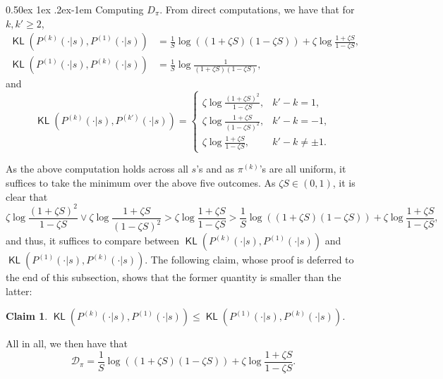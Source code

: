 \documentclass[twoside]{article}
\makeatletter
\renewcommand{\paragraph}{%
  \@startsection{paragraph}{4}%
  {\z@}{0.50ex \@plus 1ex \@minus .2ex}{-1em}%
  {\normalfont\normalsize\bfseries}%
}
\DeclareMathOperator{\KL}{{\mathsf{KL}}}
\def\gD{{\mathcal{D}}}
\theoremstyle{plain}
\newtheorem{claim}{Claim}[section]
\makeatother
\begin{document}
\paragraph{Computing $D_\pi$.}
From direct computations, we have that for $k, k' \geq 2$,
\begin{align*}
    \KL\left( P^{(k)}(\cdot | s), P^{(1)}(\cdot | s) \right) &= \frac{1}{S} \log\left( (1 + \zeta S) (1 - \zeta S) \right) + \zeta \log\frac{1 + \zeta S}{1 - \zeta S}, \\
    \KL\left( P^{(1)}(\cdot | s), P^{(k)}(\cdot | s) \right) &= \frac{1}{S} \log\frac{1}{(1 + \zeta S)(1 - \zeta S)},
\end{align*}
and
\begin{equation*}
    \KL\left( P^{(k)}(\cdot | s), P^{(k')}(\cdot | s) \right) =
    \begin{cases}
        \zeta \log \frac{(1 + \zeta S)^2}{1 - \zeta S}, & k' - k = 1,\\
        \zeta \log\frac{1 + \zeta S}{(1 - \zeta S)^2}, & k' - k = - 1,\\
        \zeta \log\frac{1 + \zeta S}{1 - \zeta S}, & k' - k \neq \pm 1.
    \end{cases}
\end{equation*}

As the above computation holds across all $s$'s and as $\pi^{(k)}$'s are all uniform, it suffices to take the minimum over the above five outcomes.
As $\zeta S \in (0, 1)$, it is clear that
\begin{equation*}
    \zeta \log \frac{(1 + \zeta S)^2}{1 - \zeta S} \vee \zeta \log\frac{1 + \zeta S}{(1 - \zeta S)^2} > \zeta \log\frac{1 + \zeta S}{1 - \zeta S}
    > \frac{1}{S} \log\left( (1 + \zeta S) (1 - \zeta S) \right) + \zeta \log\frac{1 + \zeta S}{1 - \zeta S},
\end{equation*}
and thus, it suffices to compare between $\KL\left( P^{(k)}(\cdot | s), P^{(1)}(\cdot | s) \right)$ and $\KL\left( P^{(1)}(\cdot | s), P^{(k)}(\cdot | s) \right)$.
The following claim, whose proof is deferred to the end of this subsection, shows that the former quantity is smaller than the latter:
\begin{claim}
\label{claim:compare-kl}
    $\KL\left( P^{(k)}(\cdot | s), P^{(1)}(\cdot | s) \right) \leq \KL\left( P^{(1)}(\cdot | s), P^{(k)}(\cdot | s) \right)$.
\end{claim}

All in all, we then have that
\begin{equation*}
    \gD_\pi = \frac{1}{S} \log\left( (1 + \zeta S) (1 - \zeta S) \right) + \zeta \log\frac{1 + \zeta S}{1 - \zeta S}.
\end{equation*}
\end{document}
